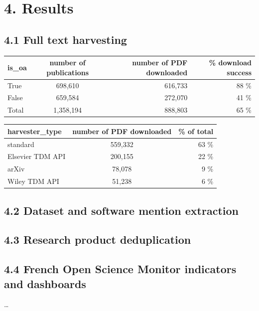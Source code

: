 \documentclass[
]{article}
\begin{document}
\hypertarget{results}{%
\section{4. Results}\label{results}}

\hypertarget{full-text-harvesting}{%
\subsection{4.1 Full text harvesting}\label{full-text-harvesting}}

\begin{longtable}[]{@{}lcrr@{}}
\toprule
is\_oa & number of publications & number of PDF downloaded & \% download
success\tabularnewline
\midrule
\endhead
True & 698,610 & 616,733 & 88 \%\tabularnewline
False & 659,584 & 272,070 & 41 \%\tabularnewline
Total & 1,358,194 & 888,803 & 65 \%\tabularnewline
\bottomrule
\end{longtable}

\begin{longtable}[]{@{}lcr@{}}
\toprule
harvester\_type & number of PDF downloaded & \% of total\tabularnewline
\midrule
\endhead
standard & 559,332 & 63 \%\tabularnewline
Elsevier TDM API & 200,155 & 22 \%\tabularnewline
arXiv & 78,078 & 9 \%\tabularnewline
Wiley TDM API & 51,238 & 6 \%\tabularnewline
\bottomrule
\end{longtable}

\hypertarget{dataset-and-software-mention-extraction}{%
\subsection{4.2 Dataset and software mention
extraction}\label{dataset-and-software-mention-extraction}}

\hypertarget{research-product-deduplication}{%
\subsection{4.3 Research product
deduplication}\label{research-product-deduplication}}

\hypertarget{french-open-science-monitor-indicators-and-dashboards}{%
\subsection{4.4 French Open Science Monitor indicators and
dashboards}\label{french-open-science-monitor-indicators-and-dashboards}}

\ldots{}
\end{document}
